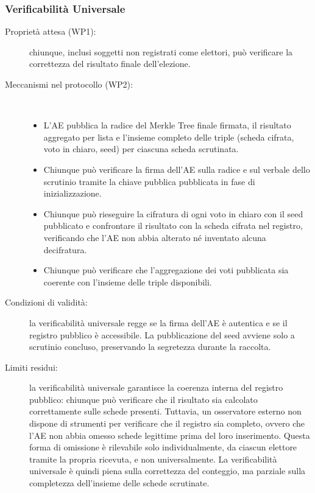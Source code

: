 \documentclass[12pt,a4paper]{article}
\begin{document}
\subsubsection{Verificabilità Universale}
\begin{description}
  \item[Proprietà attesa (WP1):] chiunque, inclusi soggetti non registrati come elettori, può verificare la correttezza del risultato finale dell'elezione.
  \item[Meccanismi nel protocollo (WP2):] \
    \begin{itemize}
      \item L'AE pubblica la radice del Merkle Tree finale firmata, il risultato aggregato per lista e l'insieme completo delle triple (scheda cifrata, voto in chiaro, seed) per ciascuna scheda scrutinata.
      \item Chiunque può verificare la firma dell'AE sulla radice e sul verbale dello scrutinio tramite la chiave pubblica pubblicata in fase di inizializzazione.
      \item Chiunque può rieseguire la cifratura di ogni voto in chiaro con il seed pubblicato e confrontare il risultato con la scheda cifrata nel registro, verificando che l'AE non abbia alterato né inventato alcuna decifratura.
      \item Chiunque può verificare che l'aggregazione dei voti pubblicata sia coerente con l'insieme delle triple disponibili.
    \end{itemize}
  \item[Condizioni di validità:] la verificabilità universale regge se la firma dell'AE è autentica e se il registro pubblico è accessibile. La pubblicazione del seed avviene solo a scrutinio concluso, preservando la segretezza durante la raccolta.
  \item[Limiti residui:] la verificabilità universale garantisce la coerenza interna del registro pubblico: chiunque può verificare che il risultato sia calcolato correttamente sulle schede presenti. Tuttavia, un osservatore esterno non dispone di strumenti per verificare che il registro sia completo, ovvero che l'AE non abbia omesso schede legittime prima del loro inserimento. Questa forma di omissione è rilevabile solo individualmente, da ciascun elettore tramite la propria ricevuta, e non universalmente. La verificabilità universale è quindi piena sulla correttezza del conteggio, ma parziale sulla completezza dell'insieme delle schede scrutinate.
\end{description}
\end{document}
